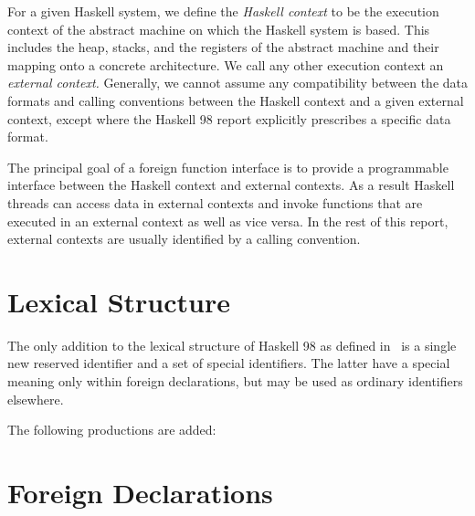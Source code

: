 \documentclass[a4paper,twosides]{article}
\begin{document}
For a given Haskell system, we define the \emph{Haskell context} to be the
execution context of the abstract machine on which the Haskell system is
based.  This includes the heap, stacks, and the registers of the abstract
machine and their mapping onto a concrete architecture.  We call any other
execution context an \emph{external context.}  Generally, we cannot assume any
compatibility between the data formats and calling conventions between the
Haskell context and a given external context, except where the Haskell 98
report explicitly prescribes a specific data format.

The principal goal of a foreign function interface is to provide a
programmable interface between the Haskell context and external contexts.  As
a result Haskell threads can access data in external contexts and invoke
functions that are executed in an external context as well as vice versa.  In
the rest of this report, external contexts are usually identified by a calling
convention. 


\newpage
\section{Lexical Structure}

The only addition to the lexical structure of Haskell 98 as defined
in~\cite[Section~2]{haskell98} is a single new reserved identifier and a set
of special identifiers.  The latter have a special meaning only within foreign
declarations, but may be used as ordinary identifiers elsewhere.

The following productions are added:
%
\begin{grammar}
\end{grammar}


\newpage
\section{Foreign Declarations}
\end{document}
